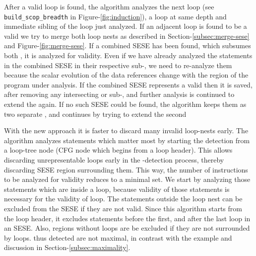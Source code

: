 \documentclass{sig-alternate}
\begin{document}
After a valid loop is found, the algorithm analyzes the next loop
(see \texttt{build\_scop\_breadth} in Figure-\ref{fig:induction}), a loop at
same depth and immediate sibling of the loop just analyzed.  If an adjacent loop
is found to be a valid \SCoP{,} we try to merge both loop nests as described in
Section-\ref{subsec:merge-sese} and Figure-\ref{fig:merge-sese}.  If a combined
SESE has been found, which subsumes both , it is analyzed for
validity. Even if we have already analyzed the statements in the combined SESE
in their respective sub-, we need to re-analyze them because the scalar
evolution of the data references change with the region of the program under
analysis. If the combined SESE represents a valid \SCoP{,} then it is saved, after
removing any intersecting or sub-, and further analysis is continued to
extend the \SCoP{} again.  If no such SESE could be found, the algorithm keeps them
as two separate , and continues by trying to extend the second 

With the new approach it is faster to discard many invalid loop-nests early. The
algorithm analyzes statements which matter most by starting the \SCoP{} detection
from a loop-tree node (CFG node which begins from a loop header). This allows
discarding unrepresentable loops early in the \SCoP{}-detection process, thereby
discarding SESE region surrounding them.  This way, the number of instructions
to be analyzed for validity reduces to a minimal set.  We start by analyzing
those statements which are inside a loop, because validity of those statements
is necessary for the validity of loop.  The statements outside the loop nest can
be excluded from the SESE if they are not valid.  Since this algorithm starts
from the loop header, it excludes statements before the first, and after
the last loop in an SESE.  Also, regions without loops are be excluded if they
are not surrounded by loops.   thus detected are not maximal, in contrast
with the example and discussion in Section-\ref{subsec:maximality}.
\end{document}
